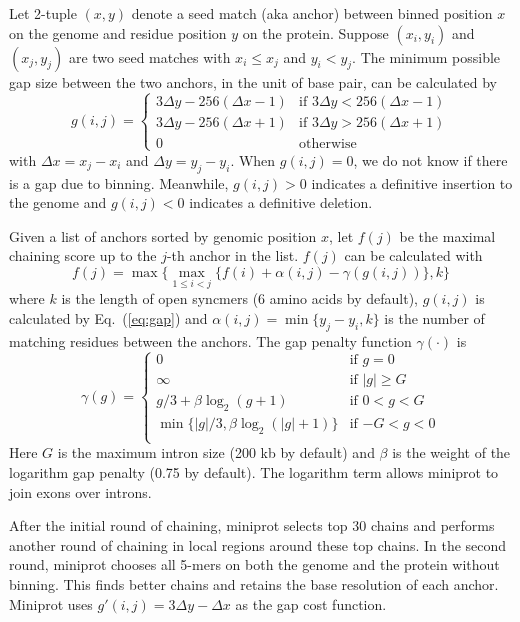 \documentclass{bioinfo}
\begin{document}
\begin{methods}
Let 2-tuple $(x,y)$ denote a seed match (aka anchor) between binned position
$x$ on the genome and residue position $y$ on the protein. Suppose $(x_i,y_i)$
and $(x_j,y_j)$ are two seed matches with $x_i\le x_j$ and $y_i<y_j$. The
minimum possible gap size between the two anchors, in the unit of base pair,
can be calculated by
\begin{equation}\label{eq:gap}
g(i,j)=\left\{\begin{array}{ll}
3\Delta y-256(\Delta x-1) & \mbox{if $3\Delta y<256(\Delta x-1)$}\\
3\Delta y-256(\Delta x+1) & \mbox{if $3\Delta y>256(\Delta x+1)$}\\
0 & \mbox{otherwise}
\end{array}\right.
\end{equation}
with $\Delta x=x_j-x_i$ and $\Delta y=y_j-y_i$. When $g(i,j)=0$, we do not know
if there is a gap due to binning. Meanwhile, $g(i,j)>0$ indicates a definitive
insertion to the genome and $g(i,j)<0$ indicates a definitive deletion.

Given a list of anchors sorted by genomic position $x$, let $f(j)$ be the
maximal chaining score up to the $j$-th anchor in the list. $f(j)$ can be
calculated with
\begin{equation}
f(j)=\max\big\{\max_{1\le i<j}\{f(i)+\alpha(i,j)-\gamma(g(i,j))\},k\big\}
\end{equation}
where $k$ is the length of open syncmers (6 amino acids by default), $g(i,j)$
is calculated by Eq.~(\ref{eq:gap}) and $\alpha(i,j)=\min\{y_j-y_i,k\}$ is the
number of matching residues between the anchors. The gap penalty function
$\gamma(\cdot)$ is
\begin{equation}\label{eq:gap-pen}
\gamma(g)=\left\{\begin{array}{ll}
0 & \mbox{if $g=0$}\\
\infty & \mbox{if $|g|\ge G$}\\
g/3+\beta\log_2(g+1) & \mbox{if $0<g<G$}\\
\min\{|g|/3,\beta\log_2(|g|+1)\} & \mbox{if $-G<g<0$}\\
\end{array}\right.
\end{equation}
Here $G$ is the maximum intron size (200 kb by default) and $\beta$ is the
weight of the logarithm gap penalty (0.75 by default).  The logarithm term
allows miniprot to join exons over introns.

After the initial round of chaining, miniprot selects top 30 chains and
performs another round of chaining in local regions around these top chains. In
the second round, miniprot chooses all 5-mers on both the genome and the
protein without binning. This finds better chains and retains the base
resolution of each anchor. Miniprot uses $g'(i,j)=3\Delta y-\Delta x$ as the
gap cost function.


\end{methods}
\end{document}
